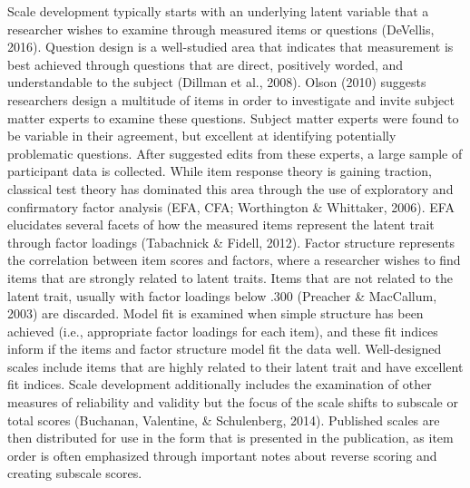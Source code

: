 \documentclass[english,man, mask]{apa6}
\theoremstyle{definition}
\theoremstyle{definition}
\theoremstyle{definition}
\theoremstyle{remark}
\begin{document}
Scale development typically starts with an underlying latent variable
that a researcher wishes to examine through measured items or questions
(DeVellis, 2016). Question design is a well-studied area that indicates
that measurement is best achieved through questions that are direct,
positively worded, and understandable to the subject (Dillman et al.,
2008). Olson (2010) suggests researchers design a multitude of items in
order to investigate and invite subject matter experts to examine these
questions. Subject matter experts were found to be variable in their
agreement, but excellent at identifying potentially problematic
questions. After suggested edits from these experts, a large sample of
participant data is collected. While item response theory is gaining
traction, classical test theory has dominated this area through the use
of exploratory and confirmatory factor analysis (EFA, CFA; Worthington
\& Whittaker, 2006). EFA elucidates several facets of how the measured
items represent the latent trait through factor loadings (Tabachnick \&
Fidell, 2012). Factor structure represents the correlation between item
scores and factors, where a researcher wishes to find items that are
strongly related to latent traits. Items that are not related to the
latent trait, usually with factor loadings below .300 (Preacher \&
MacCallum, 2003) are discarded. Model fit is examined when simple
structure has been achieved (i.e., appropriate factor loadings for each
item), and these fit indices inform if the items and factor structure
model fit the data well. Well-designed scales include items that are
highly related to their latent trait and have excellent fit indices.
Scale development additionally includes the examination of other
measures of reliability and validity but the focus of the scale shifts
to subscale or total scores (Buchanan, Valentine, \& Schulenberg, 2014).
Published scales are then distributed for use in the form that is
presented in the publication, as item order is often emphasized through
important notes about reverse scoring and creating subscale scores.
\end{document}

